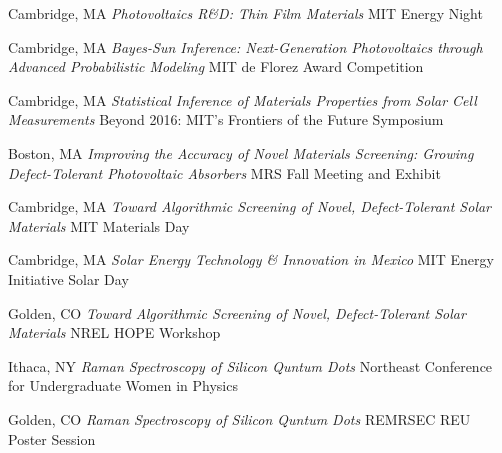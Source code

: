 \vspace{-3mm}
\datedsubsection{}
    {Cambridge, MA}
    {\textit{Photovoltaics R\&D: Thin Film Materials}}
    {MIT Energy Night}

\vspace{-3mm}
\datedsubsection{}
    {Cambridge, MA}
    {\textit{Bayes-Sun Inference: Next-Generation Photovoltaics through Advanced Probabilistic Modeling}}
    {MIT de Florez Award Competition}

\vspace{-3mm}
\datedsubsection{}
    {Cambridge, MA}
    {\textit{Statistical Inference of Materials Properties from Solar Cell Measurements}}
    {Beyond 2016: MIT’s Frontiers of the Future Symposium}

\vspace{-2mm}
    {Boston, MA}
    {\textit{Improving the Accuracy of Novel Materials Screening: Growing Defect-Tolerant Photovoltaic Absorbers}}
    {MRS Fall Meeting and Exhibit}

\vspace{-3mm}
\datedsubsection{}
    {Cambridge, MA}
    {\textit{Toward Algorithmic Screening of Novel, Defect-Tolerant Solar Materials}}
    {MIT Materials Day}

\vspace{-3mm}
\datedsubsection{}
    {Cambridge, MA}
    {\textit{Solar Energy Technology \& Innovation in Mexico}}
    {MIT Energy Initiative Solar Day}

\vspace{-3mm}
\datedsubsection{}
    {Golden, CO}
    {\textit{Toward Algorithmic Screening of Novel, Defect-Tolerant Solar Materials}}
    {NREL HOPE Workshop}

\vspace{-2mm}
    {Ithaca, NY}
    {\textit{Raman Spectroscopy of Silicon Quntum Dots}}
    {Northeast Conference for Undergraduate Women in Physics}

\vspace{-2mm}
    {Golden, CO}
    {\textit{Raman Spectroscopy of Silicon Quntum Dots}}
    {REMRSEC REU Poster Session}
